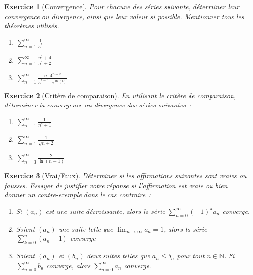 \documentclass[11.5pt,french,table]{article}
\theoremstyle{exercice}
\newtheorem{exercice}{Exercice}
\begin{document}
\begin{exercice}[Convergence]
Pour chacune des séries suivante, déterminer leur convergence ou divergence, ainsi que leur valeur si possible. Mentionner tous les théorèmes utilisés.
\begin{enumerate}
    \item $\displaystyle\sum_{n=1}^\infty \frac{1}{5^n}$
    \item $\displaystyle\sum_{n=1}^\infty \frac{n^3 + 4}{n^3 + 2}$
    \item $\displaystyle\sum_{n=1}^\infty \frac{n \cdot 4^{n-2}}{5^{n-3}\cdot e^{\ln(n)}}$
\end{enumerate}
\end{exercice}

\begin{exercice}[Critère de comparaison]
En utilisant le critère de comparaison, déterminer la convergence ou divergence des séries suivantes~:
\begin{enumerate}
    \item $\displaystyle\sum_{n=1}^\infty \frac{1}{n^2 + 1}$
    \item $\displaystyle\sum_{n=1}^\infty \frac{1}{\sqrt{n + 2}}$
    \item $\displaystyle\sum_{n=3}^\infty \frac{2}{\ln(n - 1)}$
\end{enumerate}
\end{exercice}

\begin{exercice}[Vrai/Faux]
Déterminer si les affirmations suivantes sont vraies ou fausses. Essayer de justifier votre réponse si l'affirmation est vraie ou bien donner un contre-exemple dans le cas contraire~:
\begin{enumerate}
    \item Si $(a_n)$ est une suite décroissante, alors la série $\displaystyle\sum_{n=0}^\infty (-1)^n a_n$ converge.
    \item Soient $(a_n)$ une suite telle que $\displaystyle \lim_{n \to \infty} a_n = 1$, alors la série $\displaystyle\sum_{k = 0}^{n} (a_n - 1)$ converge 
    \item Soient $(a_n)$ et $(b_n)$ deux suites telles que $a_n \leq b_n$ pour tout $n \in \mathbb{N}$. Si $\displaystyle\sum_{n = 0}^{\infty} b_n$ converge, alors $\displaystyle\sum_{n = 0}^{\infty} a_n$ converge.
\end{enumerate}
\end{exercice}
\end{document}
